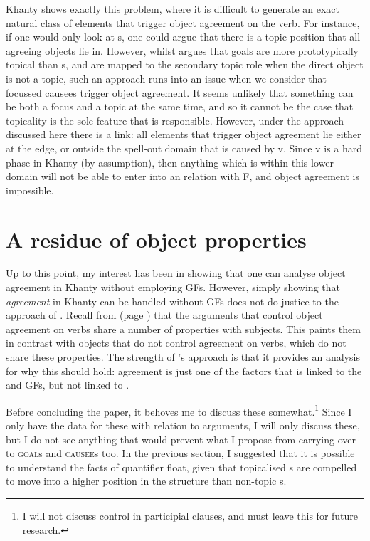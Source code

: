 \documentclass[output=paper
,modfonts
,nonflat]{langsci/langscibook}
\begin{document}
Khanty shows exactly this problem, where it is difficult to generate an exact natural class of elements that trigger object agreement on the verb.
For instance, if one would only look at \theme s, one could argue that there is a topic position that all agreeing objects lie in.
However, whilst \citet{nikolaeva2001} argues that goals are more prototypically topical than \theme s, and are mapped to the secondary topic role when the direct object is not a topic, such an approach runs into an issue when we consider that focussed causees trigger object agreement.
It seems unlikely that something can be both a focus and a topic at the same time, and so it cannot be the case that topicality is the sole feature that is responsible.
However, under the approach discussed here there is a link: all elements that trigger object agreement lie either at the edge, or outside the spell-out domain that is caused by v.
Since v is a hard phase in Khanty (by assumption), then anything which is within this lower domain will not be able to enter into an \agree{} relation with F, and object agreement is impossible.

\section{A residue of object properties}\label{residue}

Up to this point, my interest has been in showing that one can analyse object agreement in Khanty without employing GFs.
However, simply showing that \textit{agreement} in Khanty can be handled without GFs does not do justice to the approach of \citet{dn2011}.
Recall from  (page \pageref{tab:gfproperties}) that the arguments that control object agreement on verbs share a number of properties with subjects.
This paints them in contrast with objects that do not control agreement on verbs, which do not share these properties.
The strength of \citeauthor{dn2011}'s approach is that it provides an analysis for why this should hold: agreement is just one of the factors that is linked to the \subj{} and \object{} GFs, but not linked to \robj.

Before concluding the paper, it behoves me to discuss these somewhat.\footnote{I will not discuss control in participial clauses, and must leave this for future research.}
Since I only have the data for these with relation to \theme{} arguments, I will only discuss these, but I do not see anything that would prevent what I propose from carrying over to \textsc{goal}s and \textsc{causee}s too.
In the previous section, I suggested that it is possible to understand the facts of quantifier float, given that topicalised \theme s are compelled to move into a higher position in the structure than non-topic \theme s.
\end{document}
